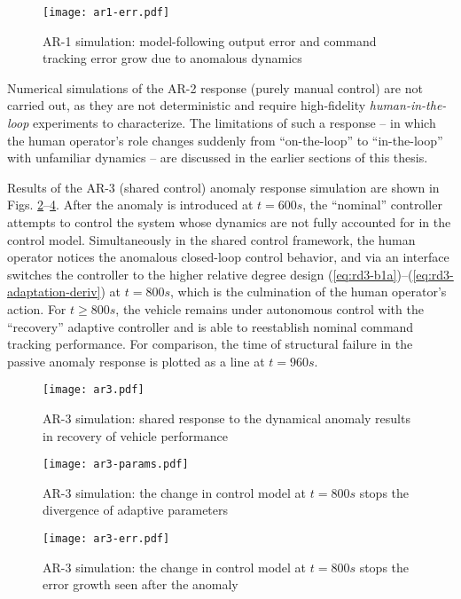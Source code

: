\begin{figure}[htbp]
	\centering
	\texttt{[image: ar1-err.pdf]}
	\caption{AR-1 simulation: model-following output error and command tracking error grow due to anomalous dynamics}
	\label{fig:ar1-err}
\end{figure}

Numerical simulations of the AR-2 response (purely manual control) are not carried out, as they are not deterministic and require high-fidelity \textit{human-in-the-loop} experiments to characterize. The limitations of such a response -- in which the human operator's role changes suddenly from ``on-the-loop'' to ``in-the-loop'' with unfamiliar dynamics -- are discussed in the earlier sections of this thesis.

Results of the AR-3 (shared control) anomaly response simulation are shown in Figs. \ref{fig:ar3-sim}--\ref{fig:ar3-err}. After the anomaly is introduced at $t = 600 s$, the ``nominal'' controller attempts to control the system whose dynamics are not fully accounted for in the control model. Simultaneously in the shared control framework, the human operator notices the anomalous closed-loop control behavior, and via an interface switches the controller to the higher relative degree design (\ref{eq:rd3-b1a})--(\ref{eq:rd3-adaptation-deriv}) at $t = 800 s$, which is the culmination of the human operator's action. For $t \geq 800 s$, the vehicle remains under autonomous control with the ``recovery'' adaptive controller and is able to reestablish nominal command tracking performance. For comparison, the time of structural failure in the passive anomaly response is plotted as a line at $t = 960 s$.

\begin{figure}[htbp]
	\centering
	\texttt{[image: ar3.pdf]}
	\caption{AR-3 simulation: shared response to the dynamical anomaly results in recovery of vehicle performance}
	\label{fig:ar3-sim}
\end{figure}

\begin{figure}[htbp]
	\centering
	\texttt{[image: ar3-params.pdf]}
	\caption{AR-3 simulation: the change in control model at $t = 800 s$ stops the divergence of adaptive parameters}
	\label{fig:ar3-params}
\end{figure}

\begin{figure}[htbp]
	\centering
	\texttt{[image: ar3-err.pdf]}
	\caption{AR-3 simulation: the change in control model at $t = 800 s$ stops the error growth seen after the anomaly}
	\label{fig:ar3-err}
\end{figure}
